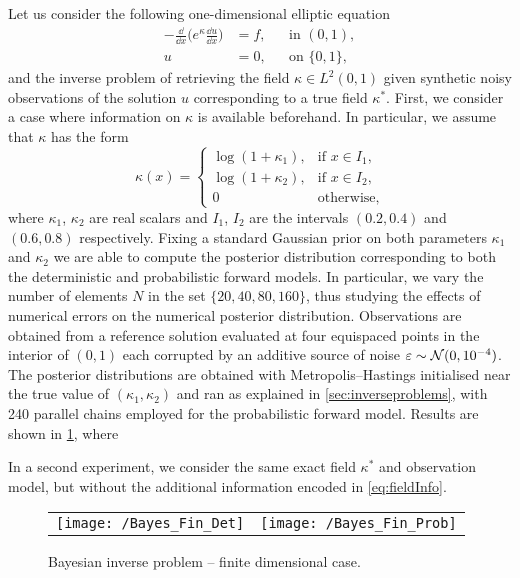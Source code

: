 Let us consider the following one-dimensional elliptic equation
\begin{equation}
\begin{aligned}
	-\frac{\dd}{\dd x}\big(e^{\kappa} \frac{\dd u}{\dd x}\big) &= f, &&\text{in } (0,1),\\
	u &= 0, &&\text{on } \{0, 1\},
\end{aligned}
\end{equation}
and the inverse problem of retrieving the field $\kappa \in L^2(0, 1)$ given synthetic noisy observations of the solution $u$ corresponding to a true field $\kappa^*$. First, we consider a case where information on $\kappa$ is available beforehand. In particular, we assume that $\kappa$ has the form
\begin{equation}\label{eq:fieldInfo}
	\kappa(x) = \begin{cases}	
				\log(1 + \kappa_1), & \mbox{if } x \in I_1, \\
				\log(1 + \kappa_2), & \mbox{if } x \in I_2, \\	
				0 & \mbox{otherwise},
				\end{cases}
\end{equation}
where $\kappa_1$, $\kappa_2$ are real scalars and $I_1$, $I_2$ are the intervals $(0.2, 0.4)$ and $(0.6, 0.8)$ respectively. Fixing a standard Gaussian prior on both parameters $\kappa_1$ and $\kappa_2$ we are able to compute the posterior distribution corresponding to both the deterministic and probabilistic forward models. In particular, we vary the number of elements $N$ in the set $\{20, 40, 80, 160\}$, thus studying the effects of numerical errors on the numerical posterior distribution. Observations are obtained from a reference solution evaluated at four equispaced points in the interior of $(0, 1)$ each corrupted by an additive source of noise $\varepsilon \sim \mathcal N(0, 10^{-4})$. The posterior distributions are obtained with Metropolis--Hastings initialised near the true value of $(\kappa_1, \kappa_2)$ and ran as explained in \cref{sec:inverseproblems}, with 240 parallel chains employed for the probabilistic forward model. Results are shown in \cref{fig:BayesFin}, where \todo

In a second experiment, we consider the same exact field $\kappa^*$ and observation model, but without the additional information encoded in \eqref{eq:fieldInfo}.

\begin{figure}[t]
	\centering
	\begin{tabular}{cc}
		\texttt{[image: /Bayes\_Fin\_Det]} & \texttt{[image: /Bayes\_Fin\_Prob]} \\
	\end{tabular}
	\caption{Bayesian inverse problem -- finite dimensional case.}
	\label{fig:BayesFin}
\end{figure}


